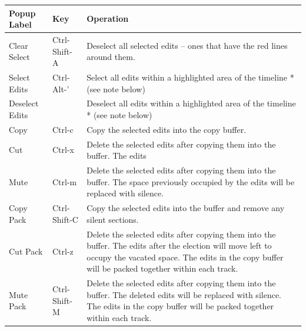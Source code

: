   \begin{longtable}{p{}
    p{} p{}}
    \toprule
    \textbf{Popup Label} & \textbf{Key} & \textbf{Operation}\\ \midrule
    \endhead
    Clear Select & Ctrl-Shift-A & Deselect all selected edits --
                                  ones that have the red lines
                                  around them.\\
                                  
    Select Edits & Ctrl-Alt-' & Select all edits within a highlighted area of the timeline * (see note below) \\
    
    Deselect Edits & & Deselect all edits within a highlighted area of the timeline * (see note below) \\

    Copy & Ctrl-c & Copy the selected edits into the copy buffer.\\

    Cut & Ctrl-x & Delete the selected edits after copying them into
                   the buffer. The edits\\

    Mute & Ctrl-m & Delete the selected edits after copying them
                    into the buffer. The space previously occupied
                    by the edits will be replaced with silence.\\

    Copy Pack & Ctrl-Shift-C & Copy the selected edits into the
                               buffer and remove any silent
                               sections.\\

    Cut Pack & Ctrl-z & Delete the selected edits after copying them
                        into the buffer. The edits after the
                        election will move left to occupy the
                        vacated space.  The edits in the copy buffer
                        will be packed together within each track.\\

    Mute Pack & Ctrl-Shift-M & Delete the selected edits after
                               copying them into the buffer.  The
                               deleted edits will be replaced with
                               silence.  The edits in the copy
                               buffer will be packed together within
                               each track.\\


\end{longtable}
